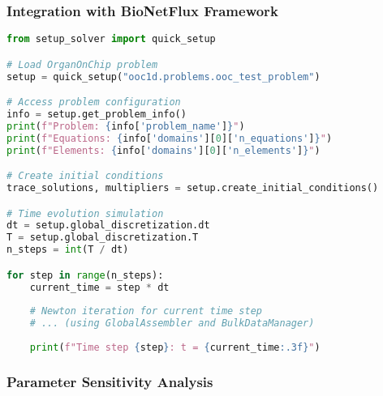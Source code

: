 \subsubsection{Integration with BioNetFlux Framework}

\begin{lstlisting}[language=Python, caption=Problem Module Usage Example]
from setup_solver import quick_setup

# Load OrganOnChip problem
setup = quick_setup("ooc1d.problems.ooc_test_problem")

# Access problem configuration
info = setup.get_problem_info()
print(f"Problem: {info['problem_name']}")
print(f"Equations: {info['domains'][0]['n_equations']}")
print(f"Elements: {info['domains'][0]['n_elements']}")

# Create initial conditions
trace_solutions, multipliers = setup.create_initial_conditions()

# Time evolution simulation
dt = setup.global_discretization.dt
T = setup.global_discretization.T
n_steps = int(T / dt)

for step in range(n_steps):
    current_time = step * dt
    
    # Newton iteration for current time step
    # ... (using GlobalAssembler and BulkDataManager)
    
    print(f"Time step {step}: t = {current_time:.3f}")
\end{lstlisting}

\subsubsection{Parameter Sensitivity Analysis}

